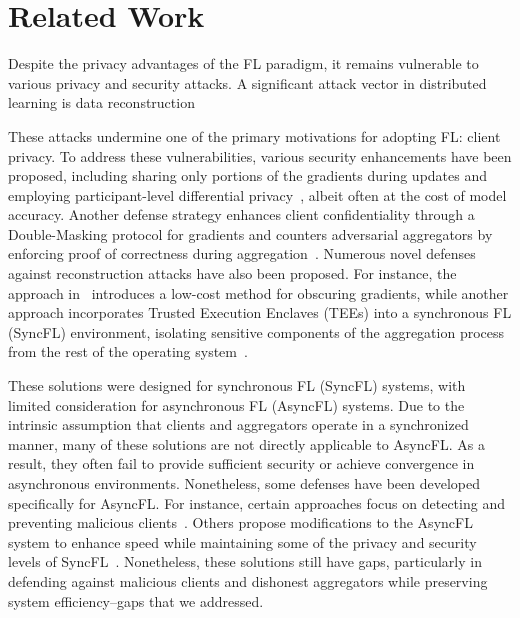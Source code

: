 \section{Related Work}
\label{sec02}
Despite the privacy advantages of the FL paradigm, it remains vulnerable to various privacy and security attacks\cite{nasshohou2019comprehensive,zhuLiGu2024evaluating,shostrmarc2017membership,melsondec2019exploiting,picromveg2023Perfectly,pasfraate2022Eluding}. A significant attack vector in distributed learning is data reconstruction~\cite{yanGeXia2023using, BoeDziSchu2023when,ZhaShaElk2024Large-scale}


These attacks undermine one of the primary motivations for adopting FL: client privacy. To address these vulnerabilities, various security enhancements have been proposed, including sharing only portions of the gradients during updates and employing participant-level differential privacy~\cite{ShoRezShm2015Privacy,weilima2023personalized,Hewancai2024clustered,HuGuoGon2023Federated,liuligao2023privacy-encoded}, albeit often at the cost of model accuracy. Another defense strategy enhances client confidentiality through a Double-Masking protocol for gradients and counters adversarial aggregators by enforcing proof of correctness during aggregation~\cite{xuliliu2020verifynet}.
Numerous novel defenses against reconstruction attacks have also been proposed. For instance, the approach in~\cite{NaHyeJun2022Closing} introduces a low-cost method for obscuring gradients, while another approach incorporates Trusted Execution Enclaves (TEEs) into a synchronous FL (SyncFL) environment, isolating sensitive components of the aggregation process from the rest of the operating system~\cite{Caozhazha2024SRFL}.


These solutions were designed for synchronous FL (SyncFL) systems, with limited consideration for asynchronous FL (AsyncFL) systems. Due to the intrinsic assumption that clients and aggregators operate in a synchronized manner, many of these solutions are not directly applicable to AsyncFL. As a result, they often fail to provide sufficient security or achieve convergence in asynchronous environments.
Nonetheless, some defenses have been developed specifically for AsyncFL. For instance, certain approaches focus on detecting and preventing malicious clients~\cite{FanLiuGon2022AFLGuard,tiacheyu2021towards,liuyuzon2024Delay}. Others propose modifications to the AsyncFL system to enhance speed while maintaining some of the privacy and security levels of SyncFL~\cite{ngumalzha2022federated}. Nonetheless, these solutions still have gaps, particularly in defending against malicious clients and dishonest aggregators while preserving system efficiency--gaps that we addressed.
